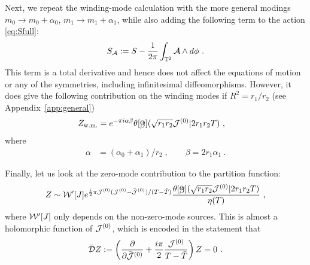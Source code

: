 \documentclass[11pt]{article}
\numberwithin{equation}{section}
\begin{document}
Next, we repeat the winding-mode calculation with the more general modings $m_0\to m_0+\alpha_0$, $m_1\to m_1+\alpha_1$, while also adding the following term to the action \eqref{eq:Sfull}:
\begin{align}\label{toptermmain}
S_{\cal A} :=  S - \frac{1}{2\pi}\int_{\mathbb T^2} {\cal A}	\wedge d\phi\ .
\end{align}
This term is a total derivative  and hence does not affect the equations of motion or any of the symmetries, including infinitesimal diffeomorphisms. However, it does give the following contribution on the winding modes if $R^2=r_1/r_2$  (see Appendix~\ref{app:general})
\begin{align}
Z_{\text{w.m.}} & = e^{-\pi i\alpha\beta}\theta \! \begin{bmatrix} \vspace{-20pt} \\ \alpha \\ \vspace{-20pt} \\ \beta \\ \vspace{-20pt} \end{bmatrix} \! ( \sqrt{r_1r_2}\mathcal{J}^{(0)} |2 r_1r_2T )\ ,
\end{align}
where
\begin{align}
\alpha &= (\alpha_0+\alpha_1)/r_2\;,	\qquad \beta = 2r_1\alpha_1\ .
\end{align}

  
Finally, let us look at the zero-mode contribution to the partition function:
\begin{align}\label{370main}
Z \sim {\cal W}'[J] e^{\frac{i}{2}\pi {\cal J}^{(0)}   ({\cal J}^{(0)}   -\bar{\cal J}^{(0)}  )/(T-\bar T)}\frac{\theta \! \begin{bmatrix} \vspace{-20pt} \\ \alpha  \\ \vspace{-20pt} \\ \beta \\ \vspace{-20pt} \end{bmatrix} \! ( \sqrt{r_1r_2}{\cal J}^{(0)}    | 2r_1r_2T )}{\eta(T)}\ ,
\end{align}
where ${\cal W}'[J]$ only depends on the non-zero-mode sources. This is almost a holomorphic function of ${\cal J}^{(0)}$, which is encoded in the statement that
\begin{align}
\bar {\cal D}Z:=\left(\frac{\partial }{\partial \bar {\cal J}^{(0)}}  +\frac{i\pi }{2}\frac{{\cal J}^{(0)}}{T-\bar T}\right) Z=0  \ .
\end{align}
\end{document}
